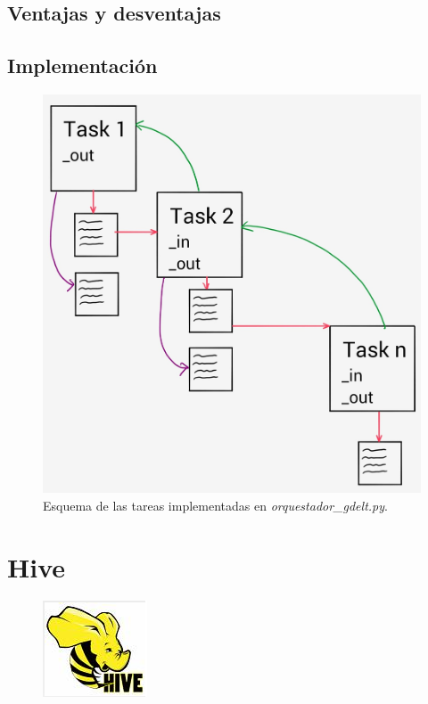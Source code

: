 \documentclass[]{article}
\begin{document}
\subsection{Ventajas y desventajas}\label{ventajas-y-desventajas-3}

\subsection{Implementación}\label{implementacion-4}

\begin{figure}[H]
\centering
\includegraphics[width=0.8 \textwidth]{img/luigi.jpg}
\caption{Esquema de las tareas implementadas en \emph{orquestador\_gdelt.py}.}
\end{figure}

\section{Hive}\label{hive}

\begin{figure}[H]
\centering
\includegraphics[width=0.3 \textwidth]{img/hive1.png}
\end{figure}
\end{document}
